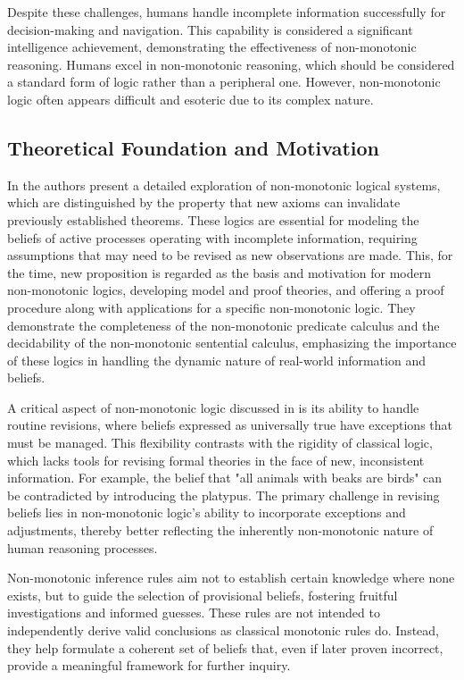 Despite these challenges, humans handle incomplete information successfully for decision-making and navigation.
This capability is considered a significant intelligence achievement, demonstrating the effectiveness of non-monotonic reasoning.
Humans excel in non-monotonic reasoning, which should be considered a standard form of logic rather than a peripheral one.
However, non-monotonic logic often appears difficult and esoteric due to its complex nature.

\subsection{Theoretical Foundation and Motivation}
In \cite{mcdermott_non-monotonic_1980} the authors present a detailed exploration of non-monotonic logical systems, which are distinguished by the property that new axioms can invalidate previously established theorems.
These logics are essential for modeling the beliefs of active processes operating with incomplete information, requiring assumptions that may need to be revised as new observations are made.
This, for the time, new proposition is regarded as the basis and motivation for modern non-monotonic logics, developing model and proof theories, and offering a proof procedure along with applications for a specific non-monotonic logic.
They demonstrate the completeness of the non-monotonic predicate calculus and the decidability of the non-monotonic sentential calculus, emphasizing the importance of these logics in handling the dynamic nature of real-world information and beliefs.

A critical aspect of non-monotonic logic discussed in \cite{mcdermott_non-monotonic_1980} is its ability to handle routine revisions, where beliefs expressed as universally true have exceptions that must be managed.
This flexibility contrasts with the rigidity of classical logic, which lacks tools for revising formal theories in the face of new, inconsistent information.
For example, the belief that "all animals with beaks are birds" can be contradicted by introducing the platypus.
The primary challenge in revising beliefs lies in non-monotonic logic's ability to incorporate exceptions and adjustments, thereby better reflecting the inherently non-monotonic nature of human reasoning processes.

Non-monotonic inference rules aim not to establish certain knowledge where none exists, but to guide the selection of provisional beliefs, fostering fruitful investigations and informed guesses.
These rules are not intended to independently derive valid conclusions as classical monotonic rules do.
Instead, they help formulate a coherent set of beliefs that, even if later proven incorrect, provide a meaningful framework for further inquiry.

